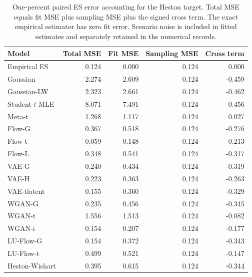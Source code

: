 \documentclass[11pt]{article}
\theoremstyle{definition}\newtheorem{definition}[theorem]{Definition}
\theoremstyle{remark}\newtheorem{remark}[theorem]{Remark}
\begin{document}
\begin{table}[htbp]
\centering\footnotesize
\setlength{\tabcolsep}{4pt}
\begin{tabular}{lrrrr}
\toprule
Model & Total MSE & Fit MSE & Sampling MSE & Cross term \\
\midrule
Empirical ES & 0.124 & 0.000 & 0.124 & 0.000 \\
Gaussian & 2.274 & 2.609 & 0.124 & -0.459 \\
Gaussian-LW & 2.323 & 2.661 & 0.124 & -0.462 \\
Student-$t$ MLE & 8.071 & 7.491 & 0.124 & 0.456 \\
Meta-t & 1.268 & 1.117 & 0.124 & 0.027 \\
Flow-G & 0.367 & 0.518 & 0.124 & -0.276 \\
Flow-t & 0.059 & 0.148 & 0.124 & -0.213 \\
Flow-L & 0.348 & 0.541 & 0.124 & -0.317 \\
VAE-G & 0.240 & 0.434 & 0.124 & -0.319 \\
VAE-H & 0.223 & 0.363 & 0.124 & -0.263 \\
VAE-tlatent & 0.155 & 0.360 & 0.124 & -0.329 \\
WGAN-G & 0.235 & 0.456 & 0.124 & -0.345 \\
WGAN-t & 1.556 & 1.513 & 0.124 & -0.082 \\
WGAN-i & 0.154 & 0.207 & 0.124 & -0.177 \\
LU-Flow-G & 0.154 & 0.372 & 0.124 & -0.343 \\
LU-Flow-t & 0.499 & 0.521 & 0.124 & -0.147 \\
Heston-Wishart & 0.395 & 0.615 & 0.124 & -0.344 \\
\bottomrule
\end{tabular}
\caption{One-percent paired ES error accounting for the Heston target. Total MSE equals fit MSE plus sampling MSE plus the signed cross term. The exact empirical estimator has zero fit error. Scenario noise is included in fitted estimates and separately retained in the numerical records.}\label{tab:r4-decomp-heston}
\end{table}
\end{document}

